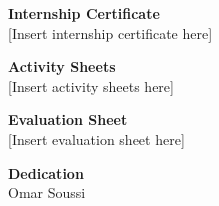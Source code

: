 \documentclass[12pt,a4paper,oneside]{report}
\begin{document}

\newpage\thispagestyle{empty}
\begin{center}\vspace*{5cm}
{\Large\bfseries Internship Certificate}\\[2cm]
{\normalsize [Insert internship certificate here]}
\end{center}

\newpage\thispagestyle{empty}
\begin{center}\vspace*{5cm}
{\Large\bfseries Activity Sheets}\\[2cm]
{\normalsize [Insert activity sheets here]}
\end{center}

\newpage\thispagestyle{empty}
\begin{center}\vspace*{5cm}
{\Large\bfseries Evaluation Sheet}\\[2cm]
{\normalsize [Insert evaluation sheet here]}
\end{center}

\newpage
\thispagestyle{empty}
\begin{center}
\vspace*{2cm}
{\Large\bfseries Dedication}\\[0.3cm]
{\normalsize Omar Soussi}\\[1.5cm]
\end{center}
\end{document}

